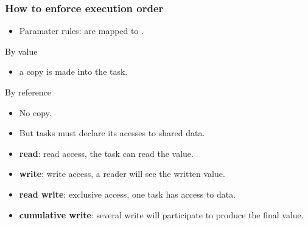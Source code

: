 \begin{frame}[fragile]
  \frametitle{How to enforce execution order}
  \begin{itemize}
  \item Paramater rules: 
    are mapped to .
  \end{itemize}
  \pause
  \begin{block}{By value}
    \begin{itemize}
    \item a copy is made into the task.
    \end{itemize}
  \end{block}
  \pause
  \begin{block}{By reference}
    \begin{itemize}
    \item No copy.
    \item But tasks must declare its acesses to shared data. 
    \item \textbf{read}: read access, the task can read the value.
    \item \textbf{write}: write access, a reader will see the written value.
    \item \textbf{read write}: exclusive access, one task has access to data.
    \item \textbf{cumulative write}:  several write will participate to produce the final
      value.
    \end{itemize}
  \end{block}
\end{frame}
